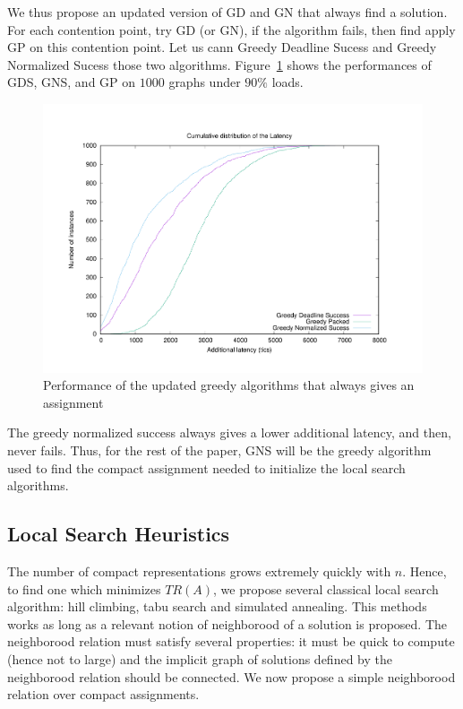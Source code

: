 \documentclass[english]{article}
\begin{document}
We thus propose an updated version of GD and GN that always find a solution. For each contention point, try GD (or GN), if the algorithm fails, then find apply GP on this contention point. Let us cann Greedy Deadline Sucess and Greedy Normalized Sucess those two algorithms. Figure~\ref{fig:greedysuccess} shows the performances of GDS, GNS, and GP on $1000$ graphs under $90\%$ loads.  
\begin{figure}[h]
	\centering
	\includegraphics[scale=0.3]{greedysuccess}
\caption{ Performance of the updated greedy algorithms that always gives an assignment}
\label{fig:greedysuccess}
\end{figure}

The greedy normalized success always gives a lower additional latency, and then, never fails. Thus, for the rest of the paper, GNS will be the greedy algorithm used to find the compact assignment needed to initialize the local search algorithms.

\subsection{Local Search Heuristics}

The number of compact representations grows extremely quickly with $n$. Hence, to find one which minimizes $TR(A)$, we propose several classical local search algorithm: hill climbing, tabu search and simulated annealing. This methods works as long as a relevant notion of neighborood of a solution is proposed. 
The neighborood relation must satisfy several properties: it must be quick to compute (hence not to large) and the implicit graph of solutions defined
by the neighborood relation should be connected. We now propose a simple neighborood relation over compact assignments.
\end{document}
